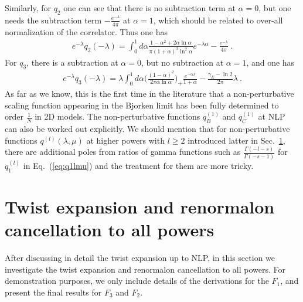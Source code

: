 \documentclass[a4paper,11pt]{article}
\begin{document}
Similarly, for $q_2$ one can see that there is no subtraction term at $\alpha=0$, but one needs the subtraction term $-\frac{e^{-\lambda}}{4\pi}$ at $\alpha=1$, which should be related to over-all normalization of the 
correlator. Thus one has
\begin{align}\label{eq:q2full}
e^{-\lambda}q_2(-\lambda)=\int_{0}^1 d\alpha \frac{1-\alpha^2+2\alpha \ln \alpha}{\pi(1+\alpha)^3\ln^2 \alpha} e^{-\lambda \alpha}-\frac{e^{-\lambda}}{4\pi} \ .
\end{align}
For $q_3$, there is a subtraction at $\alpha=0$, but no subtraction at $\alpha=1$, and one has
\begin{align}
e^{-\lambda}q_3(-\lambda)=\lambda\int_{0}^{1} d\alpha \bigg(\frac{(1-\alpha)^2}{2\pi \alpha \ln \alpha}\bigg)_+\frac{e^{-\alpha \lambda}}{1+\alpha}-\frac{\gamma_E-\ln 2}{2\pi}\lambda \ .
\end{align}
As far as we know, this is the first time in the literature that a non-perturbative scaling function appearing in the Bjorken limit has been fully determined to order $\frac{1}{N}$ in 2D models. The non-perturbative functions $q_B^{(1)}$ and $q_C^{(1)}$ at NLP can also be worked out explicitly. We should mention that for non-perturbative functions $q^{(l)}(\lambda,\mu)$ at higher powers with $l\ge 2$ introduced latter in Sec.~\ref{sec:generaltwist}, there are additional poles from ratios of gamma functions such as $\frac{\Gamma(-l-s)}{\Gamma(-s-1)}$ for $q_1^{(l)}$ in Eq.~(\ref{eq:q1lmu}) and the treatment for them are more tricky. 







\section{Twist expansion and renormalon cancellation to all powers}\label{sec:generaltwist}
After discussing in detail the twist expansion up to NLP, in this section we investigate the twist expansion and renormalon cancellation to all powers. For demonstration purposes, we only include details of the derivations for the $F_1$, and present the final results for $F_3$ and $F_2$.
\end{document}
